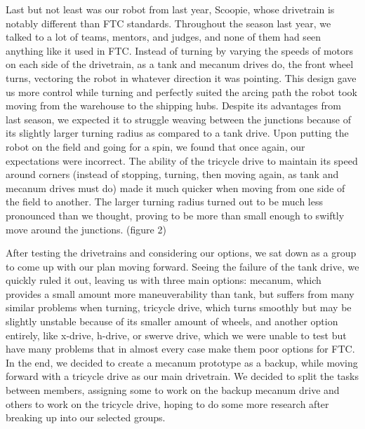 Last but not least was our robot from last year, Scoopie, whose drivetrain is notably different than FTC standards. Throughout the season last year, we talked to a lot of teams, mentors, and judges, and none of them had seen anything like it used in FTC. Instead of turning by varying the speeds of motors on each side of the drivetrain, as a tank and mecanum drives do, the front wheel turns, vectoring the robot in whatever direction it was pointing. This design gave us more control while turning and perfectly suited the arcing path the robot took moving from the warehouse to the shipping hubs. Despite its advantages from last season, we expected it to struggle weaving between the junctions because of its slightly larger turning radius as compared to a tank drive. Upon putting the robot on the field and going for a spin, we found that once again, our expectations were incorrect. The ability of the tricycle drive to maintain its speed around corners (instead of stopping, turning, then moving again, as tank and mecanum drives must do) made it much quicker when moving from one side of the field to another. The larger turning radius turned out to be much less pronounced than we thought, proving to be more than small enough to swiftly move around the junctions. (figure 2)

After testing the drivetrains and considering our options, we sat down as a group to come up with our plan moving forward. Seeing the failure of the tank drive, we quickly ruled it out, leaving us with three main options: mecanum, which provides a small amount more maneuverability than tank, but suffers from many similar problems when turning, tricycle drive, which turns smoothly but may be slightly unstable because of its smaller amount of wheels, and another option entirely, like x-drive, h-drive, or swerve drive, which we were unable to test but have many problems that in almost every case make them poor options for FTC. In the end, we decided to create a mecanum prototype as a backup, while moving forward with a tricycle drive as our main drivetrain. We decided to split the tasks between members, assigning some to work on the backup mecanum drive and others to work on the tricycle drive, hoping to do some more research after breaking up into our selected groups.

 

